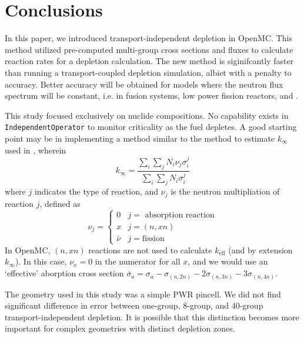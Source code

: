 \section{Conclusions}\label{sec:conclusion}
    In this paper, we introduced transport-independent depletion in OpenMC. This
    method utilized pre-computed multi-group cross sections and fluxes to
    calculate reaction rates for a depletion calculation. The new method is
    siginifcantly faster than running a transport-coupled depletion simulation,
    albiet with a penalty to accuracy. Better accuracy will be obtained for
    models where the neutron flux spectrum will be constant, i.e. in
    fusion systems, low power fission reactors, and .
         
    This study focused exclusively on nuclide compositions. No capability exists
    in \verb.IndependentOperator. to monitor criticality as the fuel depletes. A
    good starting point may be in implementing a method similar to the method to
    estimate $k_{\infty}$ used in \cite{LOVECKY2014333}, wherein
    \begin{equation}
        k_{\infty} = \frac{\sum_{i} \sum_{j} N_{i} \nu_{j}
        \sigma_{i}^{j}}{\sum_{i}\sum_{j} N_{i} \sigma_{i}^{j}}  
    \end{equation}
    where $j$ indicates the type of reaction, and $\nu_{j}$ is the neutron
    multipliation of reaction $j$, defined as
    \begin{equation}
        \nu_j = \begin{cases}
            0 & j=\text{ absorption reaction}\\
            x & j=(n,xn)\\
            \bar{\nu} & j=\text{fission}
        \end{cases}
    \end{equation}
    In OpenMC, $(n,xn)$ reactions are not used to calculate $k_\text{eff}$ (and
    by extension $k_{\infty}$). In this case, $\nu_{x} = 0$ in the numerator for
    all $x$, and we would use an `effective' aborption cross section
    $\overline{\sigma}_{a} = \sigma_{a} - \sigma_{(n,2n)} - 2\sigma_{(n,3n)} -
    3\sigma_{(n,4n)}$. 

    The geometry used in this study was a simple PWR pincell. We did not find
    significant difference in error between one-group, 8-group, and 40-group
    transport-independent depletion. It is possible that this distinction
    becomes more important for complex geometries with distinct depletion zones.
